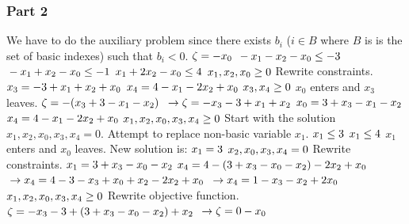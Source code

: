 \documentclass{article}
\begin{document}
\subsubsection*{Part 2}
We have to do the auxiliary problem since there exists $b_i$ ($i \in B$ where $B$ is is the set of basic indexes) such that $b_i < 0$.
$\\\zeta = -x_0$
$\\ -x_1 - x_2 - x_0 \leq -3$
$\\ -x_1 + x_2 - x_0 \leq -1$
$\\ x_1 + 2x_2 - x_0 \leq 4$
$\\ x_1, x_2, x_0 \geq 0$
\newline Rewrite constraints.
$\\ x_3 = - 3 + x_1 + x_2 + x_0$
$\\ x_4 = 4 - x_1 - 2x_2 + x_0$
$\\ x_3, x_4 \geq 0$
\newline $x_0$ enters and $x_3$ leaves.
$\\\zeta = -(x_3 + 3 - x_1 - x_2)$
$\\\to \zeta = -x_3 - 3 + x_1 + x_2$
$\\ x_0 = 3 + x_3 - x_1 - x_2$
$\\ x_4 = 4 - x_1 - 2x_2 + x_0$
$\\ x_1, x_2, x_0, x_3, x_4 \geq 0$
\newline Start with the solution $x_1, x_2, x_0, x_3, x_4 = 0$.
\newline Attempt to replace non-basic variable $x_1$.
$\\ x_1 \leq 3$
$\\ x_1 \leq 4$
\newline $x_1$ enters and $x_0$ leaves.
\newline New solution is:
$\\x_1 = 3$
$\\x_2, x_0, x_3, x_4 = 0$
\newline Rewrite constraints.
$\\ x_1 = 3 + x_3 - x_0 - x_2$
$\\ x_4 = 4 - (3 + x_3 - x_0 - x_2) - 2x_2 + x_0$
$\\\to x_4 = 4 - 3 - x_3 + x_0 + x_2 - 2x_2 + x_0$
$\\\to x_4 = 1 - x_3 - x_2 + 2x_0$
$\\ x_1, x_2, x_0, x_3, x_4 \geq 0$
\newline Rewrite objective function.
$\\\zeta = -x_3 - 3 + (3 + x_3 - x_0 - x_2) + x_2$
$\\\to \zeta = 0 - x_0$
\end{document}
